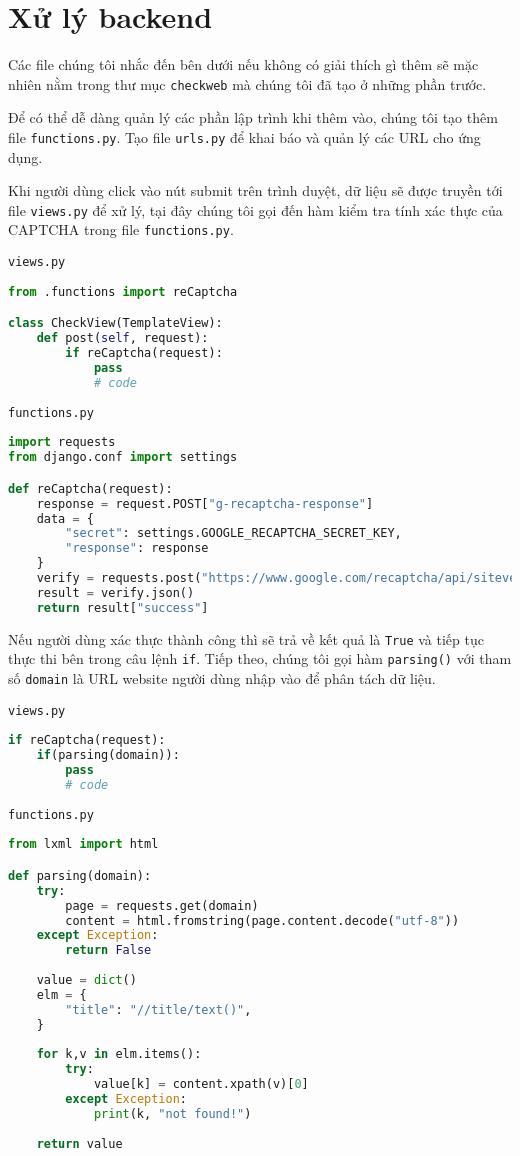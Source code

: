 \section{Xử lý backend}
Các file chúng tôi nhắc đến bên dưới nếu không có giải thích gì thêm sẽ mặc nhiên nằm trong thư mục \texttt{checkweb} mà chúng tôi đã tạo ở những phần trước.
\\\par
Để có thể dễ dàng quản lý các phần lập trình khi thêm vào, chúng tôi tạo thêm file \texttt{functions.py}. Tạo file \texttt{urls.py} để khai báo và quản lý các URL cho ứng dụng.
\\\par
Khi người dùng click vào nút submit trên trình duyệt, dữ liệu sẽ được truyền tới file \texttt{views.py} để xử lý, tại đây chúng tôi gọi đến hàm kiểm tra tính xác thực của CAPTCHA trong file \texttt{functions.py}.
\\\par
\texttt{views.py}
\begin{lstlisting}[language=Python]
from .functions import reCaptcha

class CheckView(TemplateView):
	def post(self, request):
		if reCaptcha(request):
			pass
			# code
\end{lstlisting}
\par
\texttt{functions.py}
\begin{lstlisting}[language=Python]
import requests
from django.conf import settings

def reCaptcha(request):
	response = request.POST["g-recaptcha-response"]
	data = {
		"secret": settings.GOOGLE_RECAPTCHA_SECRET_KEY,
		"response": response
	}
	verify = requests.post("https://www.google.com/recaptcha/api/siteverify", data=data)
	result = verify.json()
	return result["success"]
\end{lstlisting}
\par
Nếu người dùng xác thực thành công thì sẽ trả về kết quả là \texttt{True} và tiếp tục thực thi bên trong câu lệnh \texttt{if}. Tiếp theo, chúng tôi gọi hàm \texttt{parsing()} với tham số \texttt{domain} là URL website người dùng nhập vào để phân tách dữ liệu.
\\\par
\texttt{views.py}
\begin{lstlisting}[language=Python]
if reCaptcha(request):
	if(parsing(domain)):
		pass
		# code
\end{lstlisting}
\par
\texttt{functions.py}
\begin{lstlisting}[language=Python]
from lxml import html

def parsing(domain):
	try:
		page = requests.get(domain)
		content = html.fromstring(page.content.decode("utf-8"))
	except Exception:
		return False
		
	value = dict()
	elm = {
        "title": "//title/text()",
	}
	
	for k,v in elm.items():
		try:
			value[k] = content.xpath(v)[0]
		except Exception:
			print(k, "not found!")
			
	return value
\end{lstlisting}
